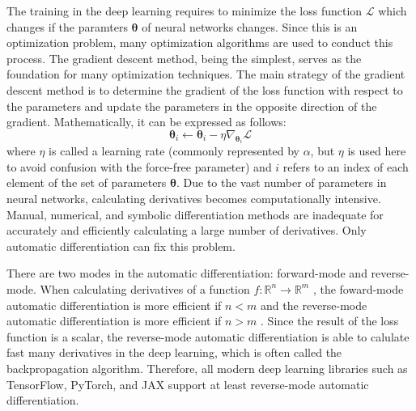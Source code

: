 The training in the deep learning requires to minimize the loss function $\mathcal{L}$ which changes if the paramters $\boldsymbol{\theta}$ of neural networks changes. Since this is an optimization problem, many optimization algorithms are used to conduct this process. The gradient descent method, being the simplest, serves as the foundation for many optimization techniques. The main strategy of the gradient descent method is to determine the gradient of the loss function with respect to the parameters and update the parameters  in the opposite direction of the gradient. Mathematically, it can be expressed as follows:
\begin{equation*}
    \boldsymbol{\theta}_{i} \leftarrow \boldsymbol{\theta}_{i} - \eta \nabla_{{\boldsymbol{\theta}}_{i}} \mathcal{L}
\end{equation*}
where $\eta$ is called a learning rate (commonly represented by $\alpha$, but $\eta$ is used here to avoid confusion with the force-free parameter) and $i$ refers to an index of each element of the set of parameters $\boldsymbol{\theta}$. Due to the vast number of parameters in neural networks, calculating derivatives becomes computationally intensive. Manual, numerical, and symbolic differentiation methods are inadequate for accurately and efficiently calculating a large number of derivatives. Only automatic differentiation can fix this problem.

There are two modes in the automatic differentiation: forward-mode and reverse-mode. When calculating derivatives of a function $f \colon \mathbb{R}^n \to \mathbb{R}^m$ , the foward-mode automatic differentiation is more efficient if $n < m$ and the reverse-mode automatic differentiation is more efficient if $n > m$ \parencite{baydin2018automatic, margossian2019review}. Since the result of the loss function is a scalar, the reverse-mode automatic differentiation is able to calulate fast many derivatives in the deep learning, which is often called the backpropagation algorithm. Therefore, all modern deep learning libraries such as TensorFlow, PyTorch, and JAX support at least reverse-mode automatic differentiation.

